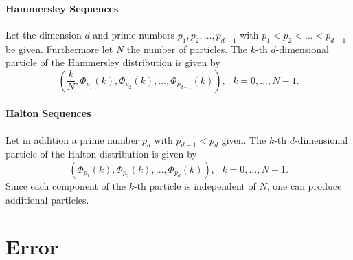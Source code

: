 \paragraph{Hammersley Sequences}
Let the dimension $d$ and prime numbers $p_1, p_2, \ldots, p_{d-1}$
with $p_1 < p_2 < \ldots < p_{d-1}$ be given. Furthermore let $N$ the
number of particles.  The $k$-th $d$-dimensional particle of the
Hammersley distribution is given by
\[
  \left( \dfrac{k}{N}, \Phi_{p_1}(k), \Phi_{p_2}(k), \ldots, \Phi_{p_{d-1}}(k) \right), \textbf{   } k=0,\ldots,N-1.
\]

\paragraph{Halton Sequences}
Let in addition a prime number $p_d$ with $p_{d-1} < p_d$ given.  The
$k$-th $d$-dimensional particle of the Halton distribution is given by
\[
  \left( \Phi_{p_1}(k), \Phi_{p_2}(k), \ldots, \Phi_{p_d}(k) \right), \textbf{   } k=0,\ldots,N-1.
\]
Since each component of the $k$-th particle is independent of $N$, one
can produce additional particles.

\section{Error}

